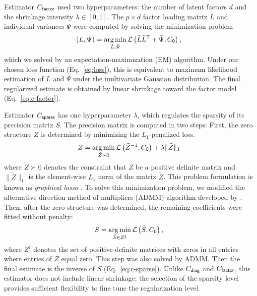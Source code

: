 \documentclass[10pt]{article}
\newcommand{\loss}[1]{\mathcal L\left(#1\right)}
\newcommand{\T}{{\sf T}}
\DeclareMathOperator*{\argmin}{arg\,min}
\begin{document}
Estimator $C_{\sf factor}$ used two hyperparameters: the number of latent factors $d$ and the shrinkage intensity $\lambda \in [0, 1]$.  
The $p\times d$ factor loading matrix $L$ and individual variances $\Psi$ were computed by solving the minimization problem
\begin{equation}
(L,\Psi) = \argmin\limits_{\tilde L,\tilde\Psi} \loss{\tilde L \tilde L^\T + \tilde\Psi,C_{\sf 0}},
\end{equation}
which we solved by an expectation-maximization (EM) algorithm.  Under our chosen loss function (Eq.~\ref{eq:loss}), this is equivalent to maximum likelihood estimation of $L$ and $\Psi$ under the multivariate Gaussian distribution.  The final regularized estimate is obtained by linear shrinkage toward the factor model (Eq.~\ref{eq:c-factor}). 

Estimator $C_{\sf sparse}$  has one hyperparameter $\lambda$, which regulates the sparsity of its precision matrix $S$. The precision matrix is computed in two steps: First, the zero structure $Z$ is determined by minimizing the $L_1$-penalized loss.
\begin{equation}
Z = \argmin\limits_{\tilde Z \succ 0} \loss{{\tilde Z}^{-1},C_{\sf 0}} + \lambda \|\tilde Z \|_1
\end{equation}
where $\tilde Z\succ 0$ denotes the constraint that $\tilde Z$ be a positive definite matrix and $\|\tilde Z\|_1$ is the element-wise $L_1$ norm of the matrix $\tilde Z$. This problem formulation is known as \emph{graphical lasso} \cite{Friedman:2008}. To solve this minimization problem, we modified the alternative-direction method of multipliers (ADMM) algorithm developed by \cite{Ma:2013}. 
Then, after the zero structure was determined, the remaining coefficients were fitted without penalty:
\begin{equation}
S = \argmin\limits_{\tilde S \in Z^\sharp} \loss{\tilde S,C_{\sf 0}},
\end{equation}
where $Z^\sharp$ denotes the set of positive-definite matrices with zeros in all entries where entries of $Z$ equal zero.  This step was also solved by ADMM.  Then the final estimate is the inverse of $S$ (Eq.~\ref{eq:c-sparse}). Unlike $C_{\sf diag}$ and $C_{\sf factor}$, this estimator does not include linear shrinkage: the selection of the sparsity level provides sufficient flexibility to fine tune the regularization level.
\end{document}
